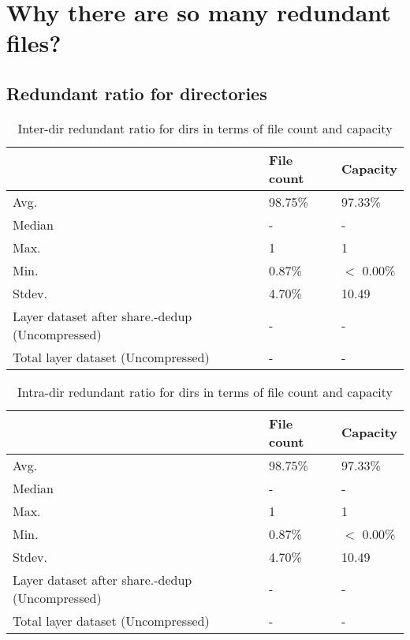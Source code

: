 \section{Why there are so many redundant files?}
\label{sec:redundant_layers}

\subsection{Redundant ratio for directories}

\begin{table} 
	\centering 
	\scriptsize  
	\caption{Inter-dir redundant ratio for dirs in terms of file count and capacity} \label{tbl:intra_dup_ratio_dirs} 
	\begin{tabular}{|l|l|l|}%
		\hline 
		& File count & Capacity \\
		\hline
		Avg. & 98.75\% & 97.33\%\\
		\hline
		Median & - & - \\
		\hline
		Max. & 1 & 1\\
		\hline
		Min.  & 0.87\%  & $<$ 0.00\%\\
		\hline
		Stdev.  &  4.70\% & 10.49\\
		\hline
		Layer dataset after share.-dedup (Uncompressed) & -  & -\\
		\hline 
		Total layer dataset (Uncompressed) &  -	& -\\
		\hline
	\end{tabular} 
\end{table}

\begin{table} 
	\centering 
	\scriptsize  
	\caption{Intra-dir redundant ratio for dirs in terms of file count and capacity} \label{tbl:inter_dup_ratio_dirs} 
	\begin{tabular}{|l|l|l|}%
		\hline 
		& File count & Capacity \\
		\hline
		Avg. & 98.75\% & 97.33\%\\
		\hline
		Median & - & - \\
		\hline
		Max. & 1 & 1\\
		\hline
		Min.  & 0.87\%  & $<$ 0.00\%\\
		\hline
		Stdev.  &  4.70\% & 10.49\\
		\hline
		Layer dataset after share.-dedup (Uncompressed) & -  & -\\
		\hline 
		Total layer dataset (Uncompressed) &  -	& -\\
		\hline
	\end{tabular} 
\end{table}

